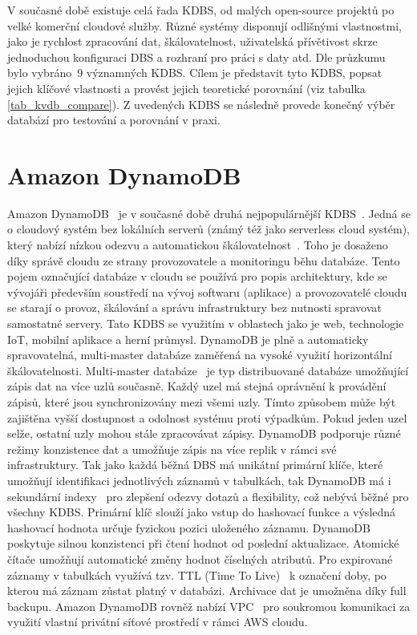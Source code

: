 \documentclass[czech,master,dept460,male,csharp,cpdeclaration]{diploma}
\begin{document}
	V současné době existuje celá řada KDBS, od malých open-source projektů po velké komerční cloudové služby. Různé systémy disponují odlišnými vlastnostmi, jako je rychlost zpracování dat, škálovatelnost, uživatelská přívětivost skrze jednoduchou konfiguraci DBS a rozhraní pro práci s daty atd. Dle průzkumu~\cite{predictiveanalyticstoday,g2,db-engineers-ranking} bylo vybráno~9 významných KDBS. Cílem je představit tyto KDBS, popsat jejich klíčové vlastnosti a provést jejich teoretické porovnání (viz tabulka \ref{tab_kvdb_compare}). Z uvedených KDBS se následně provede konečný výběr databází pro testování a porovnání v praxi.
	
	\section{Amazon DynamoDB}
	
	Amazon DynamoDB~\cite{dynamodb} je v současné době druhá nejpopulárnější KDBS~\cite{dynamodb-dbengines-rank2}. Jedná se o cloudový systém bez lokálních serverů (známý též jako serverless cloud systém), který nabízí nízkou odezvu a automatickou škálovatelnost~\cite{dynamodb-autoscaling}. Toho je dosaženo díky správě cloudu ze strany provozovatele a monitoringu běhu databáze. Tento pojem označující databáze v cloudu se používá pro popis architektury, kde se vývojáři především soustředí na vývoj softwaru (aplikace) a provozovatelé cloudu se starají o provoz, škálování a správu infrastruktury bez nutnosti spravovat samostatné servery. Tato KDBS se využitím v oblastech jako je web, technologie IoT, mobilní aplikace a herní průmysl. DynamoDB je plně a automaticky spravovatelná, multi-master databáze zaměřená na vysoké využití horizontální škálovatelnosti. Multi-master databáze~\cite{postgres-multimaster-replication} je typ distribuované databáze umožňující zápis dat na více uzlů současně. Každý uzel má stejná oprávnění k provádění zápisů, které jsou synchronizovány mezi všemi uzly. Tímto způsobem může být zajištěna vyšší dostupnost a odolnost systému proti výpadkům. Pokud jeden uzel selže, ostatní uzly mohou stále zpracovávat zápisy. DynamoDB podporuje různé režimy konzistence dat a umožňuje zápis na více replik v rámci své infrastruktury. Tak jako každá běžná DBS má unikátní primární klíče, které umožňují identifikaci jednotlivých záznamů v tabulkách, tak DynamoDB má i sekundární indexy~\cite{dynamodb-secondary-index} pro zlepšení odezvy dotazů a flexibility, což nebývá běžné pro všechny KDBS. Primární klíč slouží jako vstup do hashovací funkce a výsledná hashovací hodnota určuje fyzickou pozici uloženého záznamu. DynamoDB poskytuje silnou konzistenci při čtení hodnot od poslední aktualizace. Atomické čítače umožňují automatické změny hodnot číselných atributů. Pro expirované záznamy v tabulkách využívá tzv. TTL (Time To Live)~\cite{ttl} k označení doby, po kterou má záznam zůstat platný v databázi. Archivace dat je umožněna díky full backupu. Amazon DynamoDB rovněž nabízí VPC~\cite{vpc} pro soukromou komunikaci za využití vlastní privátní síťové prostředí v rámci AWS cloudu.
	
\end{document}
